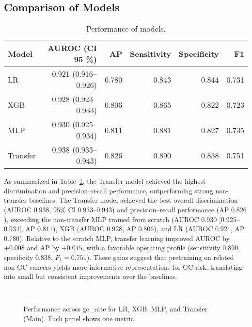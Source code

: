 \documentclass[diagnostics,article,submit,pdftex,moreauthors]{Definitions/mdpi}
\begin{document}
\subsection{Comparison of Models}
%
\begin{table}[H]
\caption{Performance of models.\label{tab:model-compare-gc1}}
\centering
\begin{tabular}{lrrrrr}
\toprule
Model & AUROC (CI 95 \%) & AP & Sensitivity & Specificity & F1 \\
\midrule
LR & 0.921 (0.916--0.926) & 0.780 & 0.843 & 0.844 & 0.731 \\
XGB & 0.928 (0.923--0.933) & 0.806 & 0.865 & 0.822 & 0.723 \\
MLP & 0.930 (0.925--0.934) & 0.811 & 0.881 & 0.827 & 0.735 \\
Transfer & 0.938 (0.933--0.943) & 0.826 & 0.890 & 0.838 & 0.751 \\
\bottomrule
\end{tabular}
\end{table}
As summarized in Table~\ref{tab:model-compare-gc1}, the Transfer model achieved the highest discrimination and precision–recall performance, outperforming strong non-transfer baselines.
The Transfer model achieved the best overall discrimination (AUROC $0.938$, 95\% CI $0.933$–$0.943$) and precision--recall performance (AP $0.826$), exceeding the non-transfer MLP trained from scratch (AUROC $0.930$ [0.925–0.934], AP $0.811$), XGB (AUROC $0.928$, AP $0.806$), and LR (AUROC $0.921$, AP $0.780$).
Relative to the scratch MLP, transfer learning improved AUROC by $+0.008$ and AP by $+0.015$, with a favorable operating profile (sensitivity $0.890$, specificity $0.838$, $F_1=0.751$). These gains suggest that pretraining on related non-GC cancers yields more informative representations for GC risk, translating into small but consistent improvements over the baselines.






\begin{figure}[H]
\centering
{}
 \\
\caption{Performance across gc\_rate for LR, XGB, MLP, and Transfer (Main). Each panel shows one metric.}
\label{fig:model-gcrate}
\end{figure}
\end{document}

